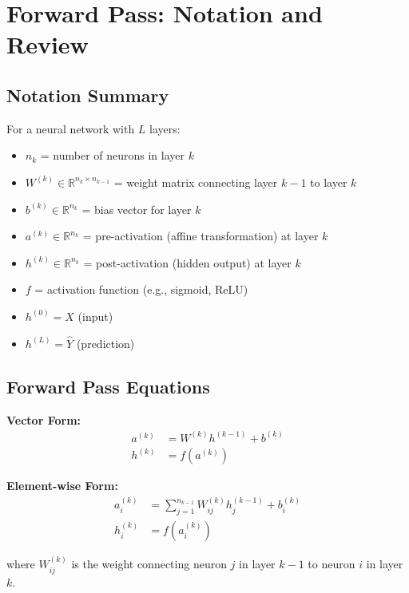 \section{Forward Pass: Notation and Review}

\subsection{Notation Summary}

For a neural network with $L$ layers:
\begin{itemize}
    \item $n_k$ = number of neurons in layer $k$
    \item $W^{(k)} \in \mathbb{R}^{n_k \times n_{k-1}}$ = weight matrix connecting layer $k-1$ to layer $k$
    \item $b^{(k)} \in \mathbb{R}^{n_k}$ = bias vector for layer $k$
    \item $a^{(k)} \in \mathbb{R}^{n_k}$ = pre-activation (affine transformation) at layer $k$
    \item $h^{(k)} \in \mathbb{R}^{n_k}$ = post-activation (hidden output) at layer $k$
    \item $f$ = activation function (e.g., sigmoid, ReLU)
    \item $h^{(0)} = X$ (input)
    \item $h^{(L)} = \hat{Y}$ (prediction)
\end{itemize}

\subsection{Forward Pass Equations}

\textbf{Vector Form:}
\begin{align}
a^{(k)} &= W^{(k)} h^{(k-1)} + b^{(k)} \label{eq:forward_affine} \\
h^{(k)} &= f(a^{(k)}) \label{eq:forward_activation}
\end{align}

\textbf{Element-wise Form:}
\begin{align}
a_i^{(k)} &= \sum_{j=1}^{n_{k-1}} W_{ij}^{(k)} h_j^{(k-1)} + b_i^{(k)} \\
h_i^{(k)} &= f(a_i^{(k)})
\end{align}

where $W_{ij}^{(k)}$ is the weight connecting neuron $j$ in layer $k-1$ to neuron $i$ in layer $k$.

